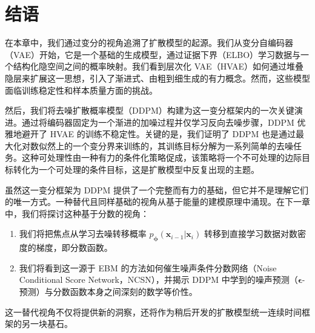 \newpage
\section{结语}\label{sec:ch2_cr}


在本章中，我们通过变分的视角追溯了扩散模型的起源。我们从变分自编码器（VAE）开始，它是一个基础的生成模型，通过证据下界（ELBO）学习数据与一个结构化隐空间之间的概率映射。我们看到层次化 VAE（HVAE）如何通过堆叠隐层来扩展这一思想，引入了渐进式、由粗到细生成的有力概念。然而，这些模型面临训练稳定性和样本质量方面的挑战。





然后，我们将去噪扩散概率模型（DDPM）构建为这一变分框架内的一次关键演进。通过将编码器固定为一个渐进的加噪过程并仅学习反向去噪步骤，DDPM 优雅地避开了 HVAE 的训练不稳定性。关键的是，我们证明了 DDPM 也是通过最大化对数似然上的一个变分界来训练的，其训练目标分解为一系列简单的去噪任务。这种可处理性由一种有力的条件化策略促成，该策略将一个不可处理的边际目标转化为一个可处理的条件目标，这是扩散模型中反复出现的主题。





虽然这一变分框架为 DDPM 提供了一个完整而有力的基础，但它并不是理解它们的唯一方式。一种替代且同样基础的视角从基于能量的建模原理中涌现。在下一章中，我们将探讨这种基于分数的视角：
\begin{enumerate}
    \item 我们将把焦点从学习去噪转移概率 $p_{\bm{\phi}}(\mathbf{x}_{i-1}\vert\mathbf{x}_{i})$ 转移到直接学习数据对数密度的梯度，即分数函数。
    \item 我们将看到这一源于 EBM 的方法如何催生噪声条件分数网络（Noise Conditional Score Network，NCSN），并揭示 DDPM 中学到的噪声预测（$\bm{\epsilon}$-预测）与分数函数本身之间深刻的数学等价性。
\end{enumerate}

这一替代视角不仅将提供新的洞察，还将作为稍后开发的扩散模型统一连续时间框架的另一块基石。







